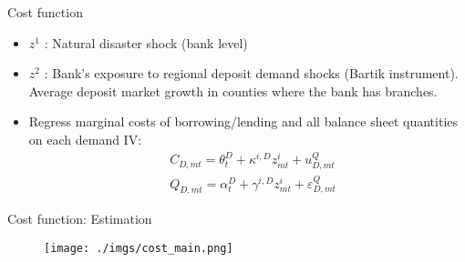 \documentclass[notes,11pt, aspectratio=169]{beamer}
\begin{document}
        \begin{frame}{Cost function}\label{cost}
            \vspace{0.5cm}
    
              \begin{itemize}
    
                \item  $z^1$ : Natural disaster shock (bank level)
                \item  $z^2$ : Bank's exposure to regional deposit demand shocks (Bartik instrument). Average deposit market growth in counties where the bank has branches.
                \vspace{0.5cm}
                \item  Regress marginal costs of borrowing/lending and all balance sheet quantities on each demand IV: %
                $$
                \begin{aligned}
                & C_{D, m t}=\theta_t^D+\kappa^{i, D} z_{m t}^i+u_{D, m t}^Q \\
                & Q_{D, m t}=\alpha_t^D+\gamma^{i, D} z_{m t}^i+\varepsilon_{D, m t}^Q
                \end{aligned}
                $$
    
                \end{itemize}
    \end{frame}

\begin{frame}{Cost function: Estimation}\label{cost}
    \vspace{0.5cm}
      
        \begin{figure}[t*]
          \centering
    
          \texttt{[image: ./imgs/cost\_main.png]}
        \end{figure}

        \hyperlink{costiv}{}
        
      \end{frame}
\end{document}
